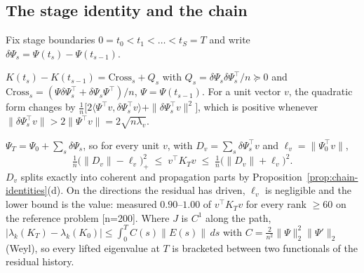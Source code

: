 \subsection{The stage identity and the chain}
\label{ssec:chain-stage}

Fix stage boundaries $0=t_0<t_1<\dots<t_S=T$ and write
$\delta\Psi_s=\Psi(t_s)-\Psi(t_{s-1})$.

\begin{proposition}
\label{prop:stage}
$K(t_s)-K(t_{s-1})=\mathrm{Cross}_s+Q_s$ with
$Q_s=\delta\Psi_s\delta\Psi_s^{\!\top}/n\succeq0$ and
$\mathrm{Cross}_s=(\Psi\delta\Psi_s^{\!\top}+\delta\Psi_s\Psi^{\!\top})/n$,
$\Psi=\Psi(t_{s-1})$. For a unit vector $v$, the quadratic form changes by
$\frac1n\big[2\langle\Psi^{\!\top}v,\delta\Psi_s^{\!\top}v\rangle+\|\delta\Psi_s^{\!\top}v\|^2\big]$,
which is positive whenever $\|\delta\Psi_s^{\!\top}v\|>2\|\Psi^{\!\top}v\|=2\sqrt{n\lambda_v}$.
\end{proposition}

\begin{theorem}
\label{thm:bracket}
$\Psi_T=\Psi_0+\sum_s\delta\Psi_s$, so for every unit $v$, with
$D_v=\sum_s\delta\Psi_s^{\!\top}v$ and $\ell_v=\|\Psi_0^{\!\top}v\|$,
\[
\tfrac1n\big(\|D_v\|-\ell_v\big)_+^2\;\le\;v^{\!\top}K_Tv\;\le\;\tfrac1n\big(\|D_v\|+\ell_v\big)^2 .
\]
$D_v$ splits exactly into coherent and propagation parts by
Proposition~\ref{prop:chain-identities}(d). On the directions the residual has
driven, $\ell_v$ is negligible and the lower bound is the value: measured
$0.90$--$1.00$ of $v^{\!\top}K_Tv$ for every rank $\ge60$ on the reference
problem [n=200]. Where $J$ is $C^1$ along the path,
$|\lambda_k(K_T)-\lambda_k(K_0)|\le\int_0^T C(s)\|E(s)\|\,ds$ with
$C=\frac2{n^2}\|\Psi\|_2^2\|\Psi'\|_2$ (Weyl), so every lifted eigenvalue at $T$
is bracketed between two functionals of the residual history.
\end{theorem}

